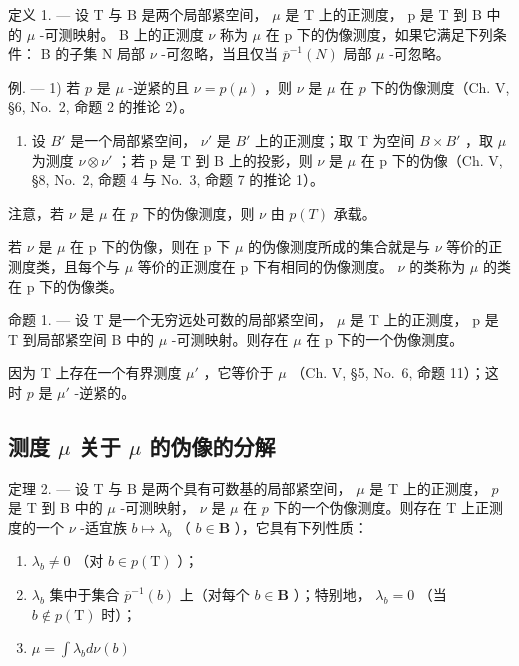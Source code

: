 定义 1. --- 设 T 与 B 是两个局部紧空间， \(\mu\) 是 T 上的正测度， p 是 T 到 B 中的 \(\mu\) -可测映射。 B 上的正测度 \(\nu\) 称为 \(\mu\) 在 p 下的伪像测度，如果它满足下列条件： B 的子集 N 局部 \(\nu\) -可忽略，当且仅当 \(\overline{p}^{-1}(N)\) 局部 \(\mu\) -可忽略。

例. --- 1) 若 \(p\) 是 \(\mu\) -逆紧的且 \(\nu = p(\mu)\) ，则 \(\nu\) 是 \(\mu\) 在 \(p\) 下的伪像测度（Ch. V, §6, No.~2, 命题 2 的推论 2）。

\begin{enumerate}
\def\labelenumi{\arabic{enumi})}
\setcounter{enumi}{1}
\tightlist
\item
  设 \(B'\) 是一个局部紧空间， \(\nu'\) 是 \(B'\) 上的正测度；取 T 为空间 \(B \times B'\) ，取 \(\mu\) 为测度 \(\nu \otimes \nu'\) ；若 p 是 T 到 B 上的投影，则 \(\nu\) 是 \(\mu\) 在 p 下的伪像（Ch. V, §8, No.~2, 命题 4 与 No.~3, 命题 7 的推论 1）。
\end{enumerate}

注意，若 \(\nu\) 是 \(\mu\) 在 \(p\) 下的伪像测度，则 \(\nu\) 由 \(p(T)\) 承载。

若 \(\nu\) 是 \(\mu\) 在 p 下的伪像，则在 p 下 \(\mu\) 的伪像测度所成的集合就是与 \(\nu\) 等价的正测度类，且每个与 \(\mu\) 等价的正测度在 p 下有相同的伪像测度。 \(\nu\) 的类称为 \(\mu\) 的类在 p 下的伪像类。

命题 1. --- 设 T 是一个无穷远处可数的局部紧空间， \(\mu\) 是 T 上的正测度， p 是 T 到局部紧空间 B 中的 \(\mu\) -可测映射。则存在 \(\mu\) 在 p 下的一个伪像测度。

因为 T 上存在一个有界测度 \(\mu'\) ，它等价于 \(\mu\) （Ch. V, §5, No.~6, 命题 11）；这时 \(p\) 是 \(\mu'\) -逆紧的。

\subsection{\texorpdfstring{测度 \(\mu\) 关于 \(\mu\) 的伪像的分解}{测度 mu 关于 mu 的伪像的分解}}

定理 2. --- 设 T 与 B 是两个具有可数基的局部紧空间， \(\mu\) 是 T 上的正测度， \(p\) 是 T 到 B 中的 \(\mu\) -可测映射， \(\nu\) 是 \(\mu\) 在 \(p\) 下的一个伪像测度。则存在 T 上正测度的一个 \(\nu\) -适宜族 \(b \mapsto \lambda_b\) （ \(b \in \mathbf{B}\) ），它具有下列性质：

\begin{enumerate}
\def\labelenumi{\alph{enumi})}
\item
  \(\lambda_{b} \neq 0\) （对 \(b \in p(\mathrm{T})\) ）；
\item
  \(\lambda_{b}\) 集中于集合 \(\overline{p}^{-1}(b)\) 上（对每个 \(b\in \mathbf{B}\) ）；特别地， \(\lambda_{b} = 0\) （当 \(b\notin p(\mathrm{T})\) 时）；
\item
  \(\mu = \int \lambda_b d\nu(b)\)
\end{enumerate}


